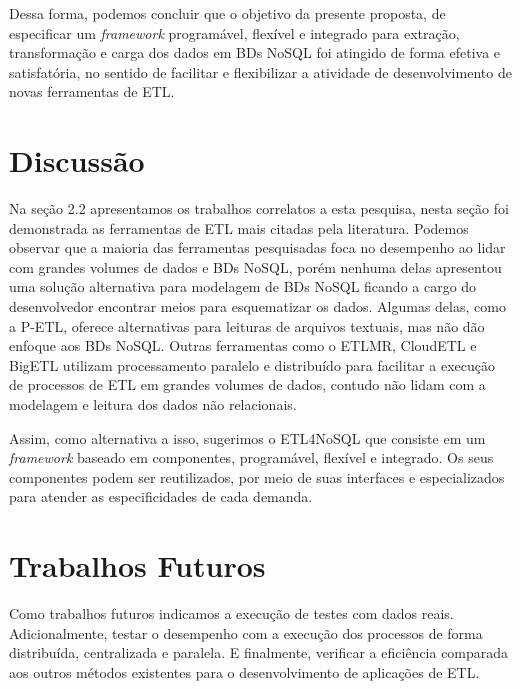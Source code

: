 Dessa forma, podemos concluir que o objetivo da presente proposta, de especificar um \textit{framework} programável, flexível e integrado para extração, transformação e carga dos dados em BDs NoSQL foi atingido de forma efetiva e satisfatória, no sentido de facilitar e flexibilizar a atividade de desenvolvimento de novas ferramentas de ETL.

\section{Discussão}

Na seção 2.2 apresentamos os trabalhos correlatos a esta pesquisa, nesta seção foi demonstrada as ferramentas de ETL mais citadas pela literatura. Podemos observar que a maioria das ferramentas pesquisadas foca no desempenho ao lidar com grandes volumes de dados e BDs NoSQL, porém nenhuma delas apresentou uma solução alternativa para modelagem de BDs NoSQL ficando a cargo do desenvolvedor encontrar meios para esquematizar os dados. Algumas delas, como a P-ETL, oferece alternativas para leituras de arquivos textuais, mas não dão enfoque aos BDs NoSQL.  Outras ferramentas como o ETLMR, CloudETL e BigETL utilizam processamento paralelo e distribuído para facilitar a execução de processos de ETL em grandes volumes de dados, contudo não lidam com a modelagem e leitura dos dados não relacionais.

Assim, como alternativa a isso, sugerimos o ETL4NoSQL que consiste em um \textit{framework} baseado em componentes, programável, flexível e integrado. Os seus componentes podem ser reutilizados, por meio de suas interfaces e especializados para atender as especificidades de cada demanda.


\section{Trabalhos Futuros}

Como trabalhos futuros indicamos a execução de testes com dados reais. Adicionalmente, testar o desempenho com a execução dos processos de forma distribuída, centralizada e paralela. E finalmente, verificar a eficiência comparada aos outros métodos existentes para o desenvolvimento de aplicações de ETL.


